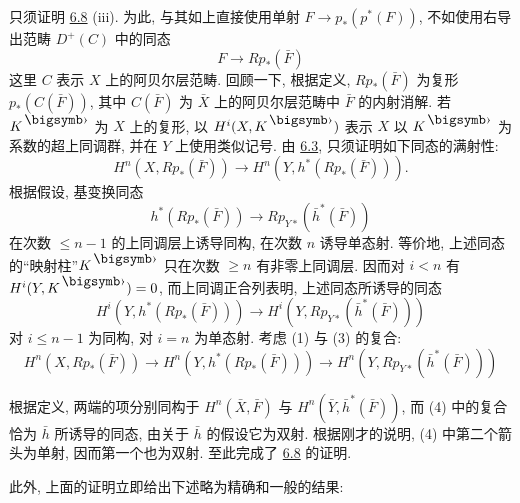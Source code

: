 只须证明 \hyperref[XII.prop6.8]{6.8} (iii). 为此, 与其如上直接使用单射 $F\rightarrow p_{\ast}(p^{\ast}(F))$, 不如使用右导出范畴 $D^{+}(C)$ 中的同态
$$
F\longrightarrow Rp_{\ast}(\bar{F})
$$
这里 $C$ 表示 $X$ 上的阿贝尔层范畴. 回顾一下, 根据定义, $Rp_{\ast}(\bar{F})$ 为复形 $p_{\ast}(C(\bar{F}))$, 其中 $C(\bar{F})$ 为 $\bar{X}$ 上的阿贝尔层范畴中 $\bar{F}$ 的内射消解. 若 $K^{\bigdot}$ 为 $X$ 上的复形, 以 $H^{i}(X,K^{\bigdot})$ 表示 $X$ 以 $K^{\bigdot}$ 为系数的超上同调群, 并在 $Y$ 上使用类似记号. 由 \hyperref[XII.cor6.3]{6.3}, 只须证明如下同态的满射性:
\begin{equation*}
H^n(X,Rp_{\ast}(\bar{F}))\longrightarrow
H^n(Y,h^{\ast}(Rp_{\ast}(\bar{F}))).\tag{1}
\end{equation*}
根据假设, 基变换同态
\begin{equation*}
h^{\ast}(Rp_{\ast}(\bar{F}))\longrightarrow
Rp_{Y\ast}(\bar{h}^{\ast}(\bar{F}))\tag{2}
\end{equation*}
在次数 $\leq n-1$ 的上同调层上诱导同构, 在次数 $n$ 诱导单态射. 等价地, 上述同态的“映射柱”\pageoriginale $K^{\bigdot}$ 只在次数 $\geq n$ 有非零上同调层. 因而对 $i<n$ 有 $H^{i}(Y,K^{\bigdot})=0$, 而上同调正合列表明, 上述同态所诱导的同态
\begin{equation*}
H^{i}(Y,h^{\ast}(Rp_{\ast}(\bar{F})))\longrightarrow
H^{i}(Y,Rp_{Y\ast}(\bar{h}^{\ast}(\bar{F})))\tag{3}
\end{equation*}
对 $i\leq n-1$ 为同构, 对 $i=n$ 为单态射. 考虑 (1) 与 (3) 的复合:
\begin{equation*}
H^n(X,Rp_{\ast}(\bar{F}))\longrightarrow
H^n(Y,h^{\ast}(Rp_{\ast}(\bar{F})))\longrightarrow
H^n(Y,Rp_{Y\ast}(\bar{h}^{\ast}(\bar{F})))\tag{4}
\end{equation*}

根据定义, 两端的项分别同构于 $H^n(\bar{X},\bar{F})$ 与 $H^n(\bar{Y},\bar{h}^{\ast}(\bar{F}))$, 而 (4) 中的复合恰为 $\bar{h}$ 所诱导的同态, 由关于 $\bar{h}$ 的假设它为双射. 根据刚才的说明, (4) 中第二个箭头为单射, 因而第一个也为双射. 至此完成了 \hyperref[XII.prop6.8]{6.8} 的证明.

此外, 上面的证明立即给出下述略为精确和一般的结果:

